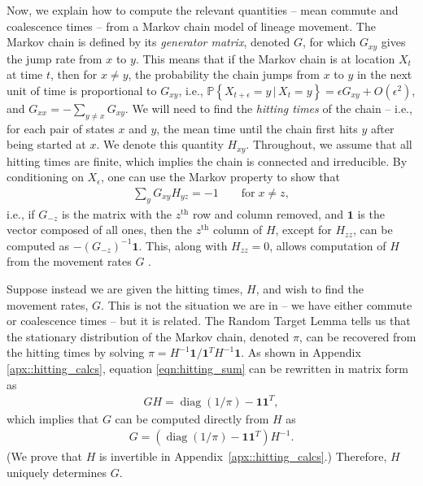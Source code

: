 \documentclass{article}
\DeclareMathOperator{\diag}{\mathop{\mbox{diag}}}
\renewcommand{\P}{\mathbb{P}}
\newcommand{\given}{\,\vert\,}
\newcommand{\PP}[1]{\P\!\left\{#1\right\}}
\newcommand{\bone}{\mathbf{1}}
\begin{document}
Now, we explain how to compute the relevant quantities --
mean commute and coalescence times -- from a Markov chain model of lineage movement.
The Markov chain is defined by its \emph{generator matrix}, denoted $G$,
for which $G_{xy}$ gives the jump rate from $x$ to $y$.
This means that if the Markov chain is at location $X_t$ at time $t$,
then for $x \neq y$, the probability the chain jumps from $x$ to $y$ in the next unit of time
is proportional to $G_{xy}$,
i.e., $\PP{X_{t+\epsilon} = y \given X_t = y} = \epsilon G_{xy} + O(\epsilon^2)$,
and $G_{xx} = - \sum_{y \neq x} G_{xy}$.
We will need to find the \emph{hitting times} of the chain --
i.e., for each pair of states $x$ and $y$, 
the mean time until the chain first hits $y$ after being started at $x$.
We denote this quantity $H_{xy}$.
Throughout, we assume that all hitting times are finite,
which implies the chain is connected and irreducible.
By conditioning on $X_\epsilon$,
one can use the Markov property to show that
\begin{align} \label{eqn:hitting_sum}
    \sum_y G_{xy} H_{yz} = -1 \qquad \text{for} \; x \neq z,
\end{align}
i.e., if $G_{-z}$ is the matrix with the $z^\text{th}$ row and column removed,
and $\bone$ is the vector composed of all ones,
then the $z^\text{th}$ column of $H$, except for $H_{zz}$,
can be computed as $- (G_{-z})^{-1} \bone$.
This, along with $H_{zz} = 0$, allows computation of $H$
from the movement rates $G$ \citep{kemeny1983finite}.

Suppose instead we are given the hitting times, $H$, and wish to find the movement rates, $G$.
This is not the situation we are in -- we have either commute or coalescence times --
but it is related.
The Random Target Lemma \citep{aldous-fill-2014}
tells us that the stationary distribution of the Markov chain, denoted $\pi$,
can be recovered from the hitting times by solving $\pi = H^{-1} \bone / \bone^T H^{-1} \bone$.
As shown in Appendix \ref{apx::hitting_calcs},
equation \eqref{eqn:hitting_sum} can be rewritten in matrix form as
\begin{align}
    G H = \diag(1/\pi) - \bone \bone^T ,
\end{align}
which implies that $G$ can be computed directly from $H$ as
\begin{align} \label{eqn:G_from_H}
    G = \left( \diag(1/\pi) - \bone \bone^T \right) H^{-1} .
\end{align}
(We prove that $H$ is invertible in Appendix~\ref{apx::hitting_calcs}.) 
Therefore, $H$ uniquely determines $G$.
\end{document}
